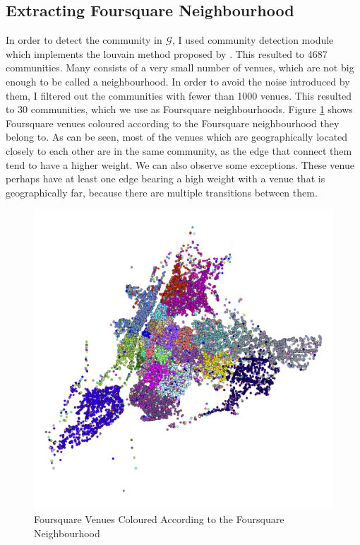 \subsection{Extracting Foursquare Neighbourhood}
In order to detect the community in $\mathcal{G}$, I used community detection module \citep{community} which implements the louvain method proposed by \cite{lambiotte2008geographical}. This resulted to 4687 communities. Many consists of a very small number of venues, which are not big enough to be called a neighbourhood. In order to avoid the noise introduced by them, I filtered out the communities with fewer than 1000 venues. This resulted to 30 communities, which we use as Foursquare neighbourhoods. Figure \ref{fig:fsq-comm} shows Foursquare venues coloured according to the Foursquare neighbourhood they belong to. As can be seen, most of the venues which are geographically located closely to each other are in the same community, as the edge that connect them tend to have a higher weight. We can also observe some exceptions. These venue perhaps have at least one edge bearing a high weight with a venue that is geographically far, because there are multiple transitions between them. 
\begin{figure}
\centering
\includegraphics[width=\columnwidth]{../fsq_foo_2.png}
\caption{Foursquare Venues Coloured According to the Foursquare Neighbourhood}
\label{fig:fsq-comm}
\end{figure}
